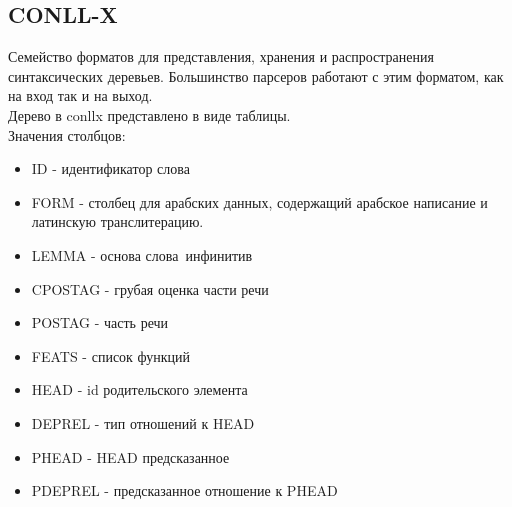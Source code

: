 \subsection{CONLL-X}
 Семейство форматов для представления, хранения и распространения синтаксических деревьев. Большинство парсеров работают с этим форматом, как на вход так и на выход. \\
 Дерево в conllx представлено в виде таблицы.\\
 Значения столбцов:\cite{conll}
 \begin{itemize}
 \item ID - идентификатор слова
 \item FORM - столбец для арабских данных, содержащий арабское написание и латинскую транслитерацию.
 \item LEMMA - основа слова\ инфинитив
 \item CPOSTAG - грубая оценка части речи
 \item POSTAG - часть речи
 \item FEATS - список функций
 \item HEAD - id родительского элемента
 \item DEPREL - тип отношений к HEAD
 \item PHEAD - HEAD предсказанное
 \item PDEPREL - предсказанное отношение к PHEAD
 \end{itemize}
